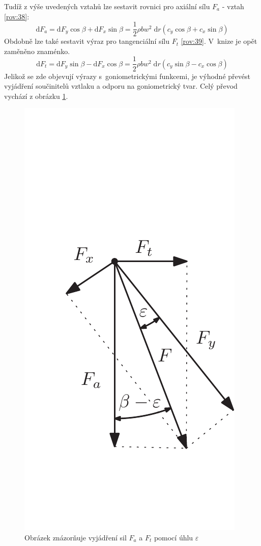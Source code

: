 	Tudíž z výše uvedených vztahů lze sestavit rovnici pro axiální sílu $F_a$ - vztah \eqref{rov:38}\cite{Rychetnik:Motory}:
	\begin{equation}
		\label{rov:38}
	\mathrm{d}F_a = \mathrm{d}F_y\cos\beta+\mathrm{d}F_x\sin\beta = \frac{1}{2}\rho bw^2\; \mathrm{d}r(c_y\cos\beta + c_x\sin\beta)
	\end{equation}
	Obdobně lze také sestavit výraz pro tangenciální sílu $F_t$ \eqref{rov:39}. V~knize \cite{Rychetnik:Motory} je opět zaměněno znaménko.
	\begin{equation}
			\label{rov:39}
		\mathrm{d}F_t = \mathrm{d}F_y\sin\beta-\mathrm{d}F_x\cos\beta = \frac{1}{2}\rho bw^2\; \mathrm{d}r(c_y\sin\beta - c_x\cos\beta)
		\end{equation}
	Jelikož se zde objevují výrazy s~goniometrickými funkcemi, je výhodné převést vyjádření součinitelů vztlaku a odporu na goniometrický tvar. Celý převod vychází z obrázku \ref{obr.epsilon}.
	\begin{figure}[H]
					\centering
						\includegraphics[]{obrazky/odvozeniepsilonp}
					\caption{Obrázek znázorňuje vyjádření sil $F_a$ a $F_t$ pomocí úhlu $\varepsilon$}
					\label{obr.epsilon}
	\end{figure}
